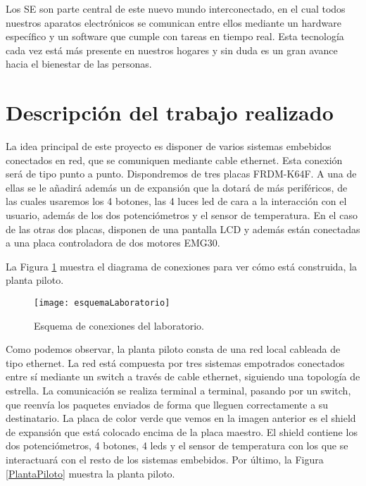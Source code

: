 Los SE son parte central de este nuevo mundo interconectado, en el cual todos nuestros aparatos electrónicos se comunican entre ellos mediante un hardware específico y un software que cumple con tareas en tiempo real. Esta tecnología cada vez está más presente en nuestros hogares y sin duda es un gran avance hacia el bienestar de las personas.


\section{Descripción del trabajo realizado}\label{sec:Descripcion}

La idea principal de este proyecto es disponer de varios sistemas embebidos conectados en red, que se comuniquen mediante cable ethernet. Esta conexión será de tipo punto a punto. Dispondremos de tres placas FRDM-K64F. A una de ellas se le añadirá además un  de expansión que la dotará de más periféricos, de las cuales usaremos los 4 botones, las 4 luces led de cara a la interacción con el usuario, además de los dos potenciómetros y el sensor de temperatura. 
En el caso de las otras dos placas, disponen de una pantalla LCD y además están conectadas a una placa controladora de dos motores EMG30. 

La Figura \ref{esqCon} muestra el diagrama de conexiones para ver cómo está construida, la planta piloto.

\begin{figure}[!h]
	\centering
	\texttt{[image: esquemaLaboratorio]}
	\caption{Esquema de conexiones del laboratorio.}\label{esqCon}
\end{figure}

Como podemos observar, la planta piloto consta de una red local cableada de tipo ethernet. La red está compuesta por tres sistemas empotrados conectados entre sí mediante un switch a través de cable ethernet, siguiendo una topología de estrella. La comunicación se realiza terminal a terminal, pasando por un switch, que reenvía los paquetes enviados de forma que lleguen correctamente a su destinatario.
La placa de color verde que vemos en la imagen anterior es el shield de expansión que está colocado encima de la placa maestro. El shield contiene los dos potenciómetros, 4 botones, 4 leds y el sensor de temperatura con los que se interactuará con el resto de los sistemas embebidos.
Por último, la Figura \ref{PlantaPiloto} muestra la planta piloto.

